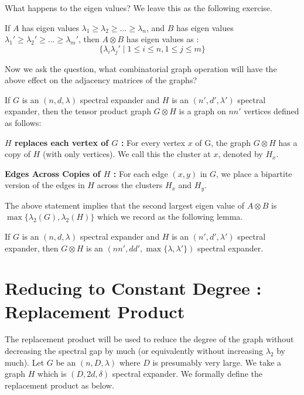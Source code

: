 \vspace{4mm}
\noindent What happens to the eigen values? 
We leave this as the following exercise.
\begin{exercise}
If $A$ has eigen values $\lambda_1 \ge \lambda_2 \ge \ldots \ge \lambda_n$, and $B$ has eigen values $\lambda_1' \ge \lambda_2' \ge \ldots \ge \lambda_m'$, then $A \otimes B$ has eigen values as :
$$\{ \lambda_i \lambda_j' \mid 1 \le i \le n, 1 \le j \le m\}$$
\end{exercise}

Now we ask the question, what combinatorial graph operation will have the above effect on the adjacency matrices of the graphs?

\begin{definition}
If $G$ is an $(n,d,\lambda)$ spectral expander and $H$ is an $(n',d',\lambda')$ spectral expander, then the tensor product graph $G \otimes H$ is a graph on $nn'$ vertices defined as follows:
\begin{description}
\item{\bf $H$ replaces each vertex of $G$ :} For every vertex $x$ of G, the graph $G \otimes H$ has a copy of $H$ (with only vertices). We call this the cluster at $x$, denoted by $H_x$.
\item{\bf Edges Across Copies of $H$ :}
For each edge $(x,y)$ in $G$, we place a bipartite version of the edges in $H$ across the clusters $H_x$ and $H_y$.
\end{description}
\end{definition}

The above statement implies that the second largest eigen value of $A \otimes B$ is $\max\{\lambda_2(G),\lambda_2(H)\}$ which  we record as the following lemma.

\begin{lemma}
If $G$ is an $(n,d,\lambda)$ spectral expander and $H$ is an $(n',d',\lambda')$ spectral expander, then $G \otimes H$ is an $(nn',dd',\max\{\lambda,\lambda'\})$ spectral expander.
\end{lemma}

\section{Reducing to Constant Degree : Replacement Product}
The replacement product will be used to reduce the degree of the graph without decreasing the spectral gap by much (or equivalently without increasing $\lambda_2$ by much). Let $G$ be an $(n,D,\lambda)$ where $D$ is presumably very large. We take a graph $H$ which is $(D,2d,\delta)$ spectral expander. We formally define the replacement product as below.

